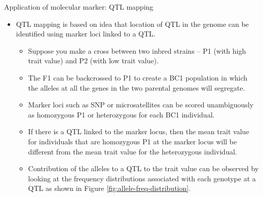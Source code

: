 \documentclass[11pt,dvipsnames,ignorenonframetext,aspectratio=169]{beamer}
\providecommand{\tightlist}{%
  \setlength{\itemsep}{0pt}\setlength{\parskip}{0pt}}
\begin{document}
\begin{frame}{Application of molecular marker: QTL mapping}
\protect\hypertarget{application-of-molecular-marker-qtl-mapping}{}
\footnotesize

\begin{itemize}
\tightlist
\item
  QTL mapping is based on idea that location of QTL in the genome can be
  identified using marker loci linked to a QTL.

  \begin{itemize}
  \tightlist
  \item
    Suppose you make a cross between two inbred strains -- P1 (with high
    trait value) and P2 (with low trait value).
  \item
    The F1 can be backcrossed to P1 to create a BC1 population in which
    the alleles at all the genes in the two parental genomes will
    segregate.
  \item
    Marker loci such as SNP or microsatellites can be scored
    unambiguously as homozygous P1 or heterozygous for each BC1
    individual.
  \item
    If there is a QTL linked to the marker locus, then the mean trait
    value for individuals that are homozygous P1 at the marker locus
    will be different from the mean trait value for the heterozygous
    individual.
  \item
    Contribution of the alleles to a QTL to the trait value can be
    observed by looking at the frequency distributions associated with
    each genotype at a QTL as shown in Figure
    \ref{fig:allele-freq-distribution}.
  \end{itemize}
\end{itemize}
\end{frame}
\end{document}

